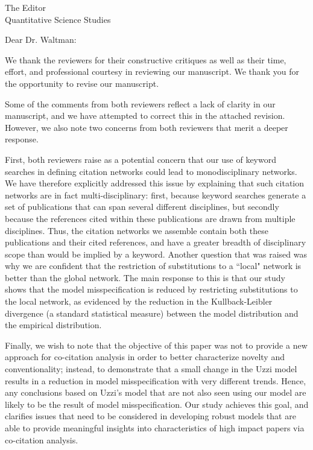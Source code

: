 \documentclass[11pt, oneside]{article}   	%
\begin{document}

The Editor\\
Quantitative Science Studies

Dear Dr. Waltman:


We thank the reviewers for their constructive critiques as well as their time, effort, and professional courtesy in reviewing our manuscript. We thank you for the opportunity to revise our manuscript. 

Some of the comments from both reviewers reflect a lack of clarity in our manuscript, and we have attempted to correct this in the attached revision. However, we also note two concerns from both reviewers that merit a deeper response.

First,   both reviewers raise as a potential concern that our use of keyword searches in defining  citation networks could lead to monodisciplinary networks. We have therefore explicitly addressed this issue by explaining that such citation networks are in fact multi-disciplinary: first, because keyword searches generate a set of publications that can span several different disciplines, but secondly because the references cited within these publications are drawn from multiple disciplines. Thus, the citation networks we assemble contain both these publications and their cited references, and have a greater breadth of disciplinary scope than would be implied by a keyword. Another  question that was raised was why we are confident that the restriction of substitutions to a ``local" network is better than the global network. The main response to this is that our study shows that the model misspecification is reduced by restricting substitutions to the local network, as evidenced by the reduction in the Kullback-Leibler divergence (a standard statistical measure) between the model distribution and the empirical distribution. 


Finally, we wish to note that the objective of this paper was not to provide a new approach for co-citation analysis in order to better characterize novelty and conventionality; instead, to demonstrate that a small change in the  Uzzi model results in a reduction in model misspecification with very different trends. Hence, any conclusions based on Uzzi's model that are not also seen  using our model are likely to be the result of  model misspecification. Our study achieves this goal, and clarifies issues that need to be considered in developing robust models that are able to provide meaningful insights into characteristics of high impact
papers via co-citation analysis.   
\end{document}
